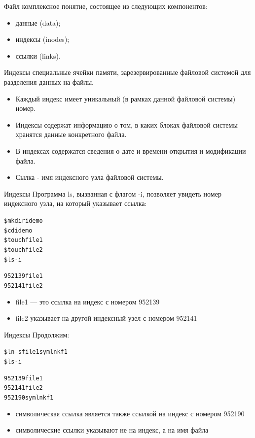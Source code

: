 \documentclass{beamer}
\begin{document}
\begin{frame}
\begin{block}{Файл}
комплексное понятие, состоящее из следующих компонентов:
\begin{itemize}
\item данные (data);
\item индексы (inodes);
\item ссылки (links).
\end{itemize}
\end{block}
\begin{block}{Индексы}
специальные ячейки памяти, зарезервированные файловой системой для разделения данных на файлы. 
\end{block}
\begin{itemize}
\item Каждый индекс имеет уникальный (в рамках данной файловой системы) номер.
\item Индексы содержат информацию о том, в каких блоках файловой системы хранятся данные конкретного файла. 
\item В индексах содержатся сведения о дате и времени открытия и модификации файла. 
\item Сылка - имя индексного узла файловой системы. 
\end{itemize}
\end{frame}

\begin{frame}[fragile]{Индексы}
Программа ls, вызванная с флагом -i, позволяет увидеть номер индексного узла, на который указывает ссылка:
\begin{alltt}
\$ mkdir idemo
\$ cd idemo
\$ touch file1
\$ touch file2
\$ ls -i

952139 file1 
952141 file2
\end{alltt}
\begin{itemize}
\item file1 — это ссылка на индекс с номером 952139 
\item file2 указывает на другой индексный узел с номером 952141
\end{itemize}
\end{frame}

\begin{frame}[fragile]{Индексы}
Продолжим:
\begin{alltt}
\$ ln -s file1 symlnkf1
\$ ls -i

952139 file1 
952141 file2 
952190 symlnkf1
\end{alltt}
\begin{itemize}
\item символическая ссылка является также ссылкой на индекс с номером 952190
\item символические ссылки указывают не на индекс, а на имя файла
\end{itemize}
\end{frame}
\end{document}
